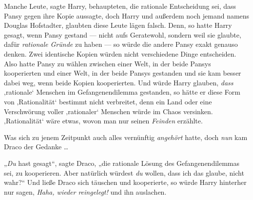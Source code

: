 Manche Leute, sagte Harry, behaupteten, die rationale Entscheidung sei, dass Pansy gegen ihre Kopie aussagte, doch Harry und außerdem noch jemand namens Douglas Hofstadter, glaubten diese Leute lägen falsch. Denn, so hatte Harry gesagt, wenn Pansy gestand — nicht aufs Geratewohl, sondern weil sie glaubte, dafür \emph{rationale Gründe} zu haben — so würde die andere Pansy exakt genauso denken. Zwei identische Kopien würden nicht verschiedene Dinge entscheiden. Also hatte Pansy zu wählen zwischen einer Welt, in der beide Pansys kooperierten und einer Welt, in der beide Pansys gestanden und sie kam besser dabei weg, wenn beide Kopien kooperierten. Und würde Harry glauben, \emph{dass} ‚rationale‘ Menschen im Gefangenendilemma gestanden, so hätte er diese Form von ‚Rationalität‘ bestimmt nicht verbreitet, denn ein Land oder eine Verschwörung voller ‚rationaler‘ Menschen würde im Chaos versinken. ‚Rationalität‘ wäre etwas, wovon man nur seinen \emph{Feinden} erzählte.

Was sich zu jenem Zeitpunkt auch alles vernünftig \emph{angehört} hatte, doch \emph{nun} kam Draco der Gedanke …

„\emph{Du} hast gesagt“, sagte Draco, „die rationale Lösung des Gefangenendilemmas sei, zu kooperieren. Aber natürlich würdest \emph{du} wollen, dass ich das glaube, nicht wahr?“ Und ließe Draco sich täuschen und kooperierte, so würde Harry hinterher nur sagen, \emph{Haha, wieder reingelegt!} und ihn auslachen.

